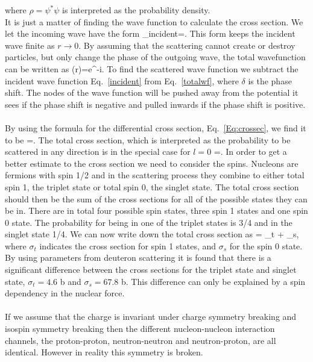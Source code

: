 where $\rho=\psi^*\psi$ is interpreted as the probability density.\\ 
It is just a matter of finding the wave function to calculate the cross section. We let the incoming wave have the form
\be
\psi_{incident}=.
\label{incident}
\ee
This form keeps the incident wave finite as $r \rightarrow 0.$ By assuming that the scattering cannot create or destroy particles, but only
change the phase of the outgoing wave, the total wavefunction can be written as
\be
\psi(r)=e^{-i\delta}.
\label{totalwf}
\ee
To find the scattered wave function we subtract the incident wave function 
Eq.~\eqref{incident} from Eq.~\eqref{totalwf},
where $\delta$ is the phase shift. 
The nodes of the wave function will be pushed away from the potential it sees if
the phase shift is negative and pulled inwards if the phase shift is 
positive.\\
\\
By using the formula for the differential cross section, Eq.~\eqref{Eq:crossec}, we find it to be
\be
{}=.
\ee
The total cross section, which is interpreted as the probability to be scattered
in any direction is in the special case for $l=0$
\be
\sigma=.
\ee
In order to get a better estimate to the cross section we need to consider the
spins.
Nucleons are fermions with spin 1/2 and in the scattering process they
combine to either total spin 1, the triplet state or total spin 0, the singlet state. The
total cross section should then be the sum of the cross sections for all of the
possible states they can be in. There are in total four possible spin states, three spin 1 states and one spin 0 state. The probability for being in one
of the triplet states is 3/4 and in the singlet state 1/4. We can now write down the total cross section as
\be
\sigma = \sigma_t + \sigma_s,
\ee 
where $\sigma_t$ indicates the cross section for spin 1 states, and $\sigma_s$ for the
spin 0 state. By using parameters from deuteron scattering it is found that 
there is a significant difference between the cross sections for the triplet
state and singlet state, $\sigma_t=4.6$ b and $\sigma_s=67.8$ b.  This
difference can only be explained by a spin dependency in the nuclear force.\\
\\
If we assume that the charge is invariant under charge symmetry breaking and isospin symmetry breaking then the different nucleon-nucleon interaction channels, the proton-proton, neutron-neutron and neutron-proton, are all  identical. However in reality this symmetry is broken.\\
